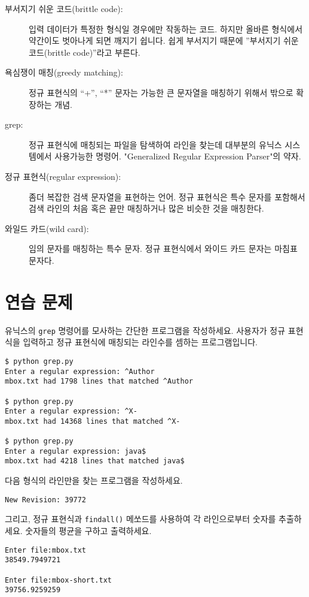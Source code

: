\begin{description}

\item[부서지기 쉬운 코드(brittle code):]
입력 데이터가 특정한 형식일 경우에만 작동하는 코드.
하지만 올바른 형식에서 약간이도 벗아나게 되면 깨지기 쉽니다.
쉽게 부서지기 때문에 ''부서지기 쉬운 코드(brittle code)''라고 부른다.

\item[욕심쟁이 매칭(greedy matching):]
정규 표현식의 ``+'', ``*'' 문자는 가능한 큰 문자열을 매칭하기 위해서 밖으로 확장하는 개념.

\item[grep:]
정규 표현식에 매칭되는 파일을 탐색하여 라인을 찾는데 대부분의 유닉스 시스템에서 사용가능한 명령어.
"Generalized Regular Expression Parser"의 약자.

\item[정규 표현식(regular expression):]
좀더 복잡한 검색 문자열을 표현하는 언어. 
정규 표현식은 특수 문자를 포함해서 검색 라인의 처음 혹은 끝만 매칭하거나 많은 비슷한 것을 매칭한다.

\item[와일드 카드(wild card):]
임의 문자를 매칭하는 특수 문자. 정규 표현식에서 와이드 카드 문자는 마침표 문자다.

\end{description}

\section{연습 문제}

\begin{ex}
유닉스의 {\tt grep} 명령어를 모사하는 간단한 프로그램을 작성하세요.
사용자가 정규 표현식을 입력하고 정규 표현식에 매칭되는 라인수를 셈하는 프로그램입니다.

\beforeverb
\begin{verbatim}
$ python grep.py
Enter a regular expression: ^Author
mbox.txt had 1798 lines that matched ^Author

$ python grep.py
Enter a regular expression: ^X-
mbox.txt had 14368 lines that matched ^X-

$ python grep.py
Enter a regular expression: java$
mbox.txt had 4218 lines that matched java$
\end{verbatim}
\afterverb
%
\end{ex}

\begin{ex}

다음 형식의 라인만을 찾는 프로그램을 작성하세요.

\verb"New Revision: 39772"

그리고, 정규 표현식과 {\tt findall()} 메쏘드를 사용하여 각 라인으로부터 숫자를 추출하세요.
숫자들의 평균을 구하고 출력하세요.

\beforeverb
\begin{verbatim}
Enter file:mbox.txt 
38549.7949721

Enter file:mbox-short.txt
39756.9259259
\end{verbatim}
\afterverb
%

\end{ex}

